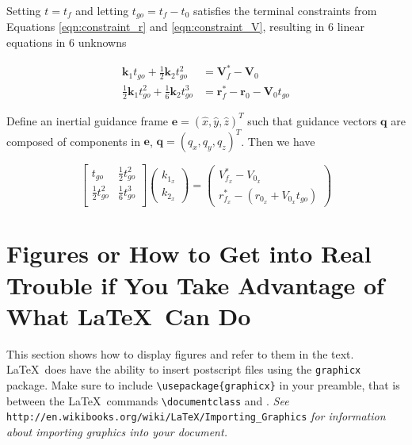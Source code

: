 Setting $t = t_f$ and letting $t_{go} = t_f - t_0$ satisfies the terminal constraints from Equations \ref{eqn:constraint_r} and \ref{eqn:constraint_V}, resulting in 6 linear equations in 6 unknowns

\begin{align}
\label{eqn:system1}
\boldsymbol{k}_1 t_{go} + \frac{1}{2}\boldsymbol{k}_2 t_{go}^2 &= \boldsymbol{V}_f^* - \boldsymbol{V}_0\\
\label{eqn:system2}
\frac{1}{2}\boldsymbol{k}_1 t_{go}^2 + \frac{1}{6}\boldsymbol{k}_2 t_{go}^3 &= \boldsymbol{r}_f^* - \boldsymbol{r}_0 - \boldsymbol{V}_0t_{go}
\end{align}

Define an inertial guidance frame $\boldsymbol{e} = (\hat{x},\hat{y},\hat{z})^T$ such that guidance vectors $\boldsymbol{q}$ are composed of components in $\boldsymbol{e}$, $\boldsymbol{q} = (q_{x},q_{y},q_{z})^T$. Then we have

\begin{equation}
  \begin{bmatrix}
    t_{go} & \frac{1}{2}t_{go}^2 \\
    \frac{1}{2}t_{go}^2 & \frac{1}{6}t_{go}^3 \\
  \end{bmatrix}
 \left(
	\begin{matrix}
	k_{1_x} \\ 
	k_{2_x} 
	\end{matrix}
\right) = 
 \left(
	\begin{matrix}
	V_{f_x}^* - V_{0_x} \\ 
	r_{f_x}^* - (r_{0_x} + V_{0_x}t_{go}) 
	\end{matrix}
\right)
\end{equation}









\section{Figures or How to Get into Real Trouble if You Take Advantage
  of What \LaTeX\ Can Do}

This section shows how to display figures and refer to them in the
text.  \LaTeX\ does have the ability to insert postscript files using
the \verb+graphicx+ package.  Make sure to include
\verb+\usepackage{graphicx}+ in your preamble, that is between the
\LaTeX\ commands \verb+\documentclass+ and
\verb++. \emph{See}
  \verb+http://en.wikibooks.org/wiki/LaTeX/Importing_Graphics+
  \emph{for information about importing graphics into your
    document.}

